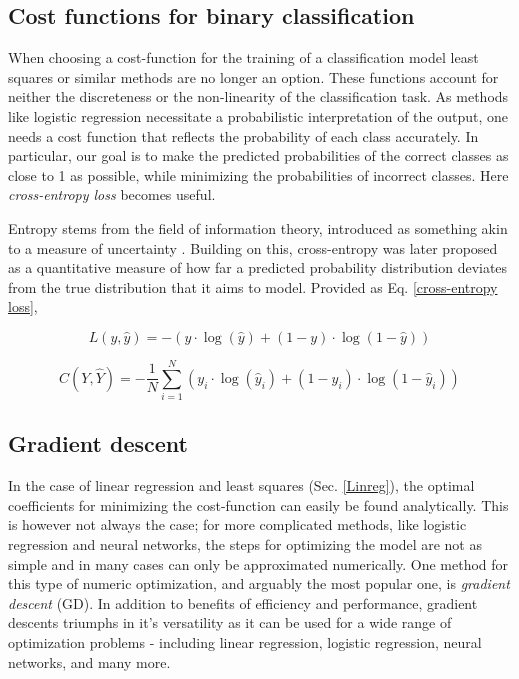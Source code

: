 \subsection{Cost functions for binary classification }\label{sec:cross-entropy}

When choosing a cost-function for the training of a classification model least squares or similar methods are no longer an option. These functions account for neither the discreteness or the non-linearity of the classification task. 
As methods like logistic regression necessitate a probabilistic interpretation of the output, one needs a cost function that reflects the probability of each class accurately. In particular, our goal is to make the predicted probabilities of the correct classes as close to 1 as possible, while minimizing the probabilities of incorrect classes. Here \textit{cross-entropy loss} becomes useful.

Entropy stems from the field of information theory, introduced as something akin to a measure of uncertainty \cite{Shore}. Building on this, cross-entropy was later proposed as a quantitative measure of how far a predicted probability distribution deviates from the true distribution that it aims to model. Provided as Eq. \ref{cross-entropy loss},

\begin{equation}\label{cross-entropy loss}
    L(y, \hat{y}) = - \left( y \cdot \log(\hat{y}) + (1 - y) \cdot \log(1 - \hat{y}) \right)
\end{equation}

\begin{equation}\label{cross-entropy cost}
    C(Y, \hat{Y}) = - \frac{1}{N} \sum_{i=1}^{N} \left( y_i \cdot \log(\hat{y}_i) + (1 - y_i) \cdot \log(1 - \hat{y}_i) \right)
\end{equation}
\subsection{Gradient descent}
In the case of linear regression and least squares (Sec. \ref{Linreg}), the optimal coefficients for minimizing the cost-function can easily be found analytically. This is however not always the case; for more complicated methods, like logistic regression and neural networks, the steps for optimizing the model are not as simple and in many cases can only be approximated numerically.  
One method for this type of numeric optimization, and arguably the most popular one, is \textit{gradient descent} (GD). In addition to benefits of efficiency and performance, gradient descents triumphs in it's versatility as it can be used for a wide range of optimization problems - including linear regression, logistic regression, neural networks, and many more. 


